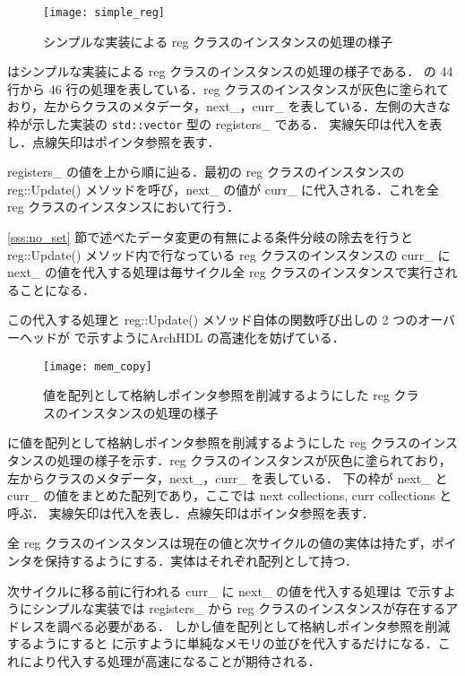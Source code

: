 \begin{figure}[t]
 \centering
 \texttt{[image: simple\_reg]}
 \caption{シンプルな実装による reg クラスのインスタンスの処理の様子}
 \label{fig:regs}
\end{figure}

 はシンプルな実装による reg クラスのインスタンスの処理の様子である．
の 44 行から 46 行の処理を表している．reg クラスのインスタンスが灰色に塗られており，左からクラスのメタデータ，next\_，curr\_
を表している．左側の大きな枠が示した実装の \verb`std::vector` 型の registers\_ である．
実線矢印は代入を表し．点線矢印はポインタ参照を表す．

registers\_ の値を上から順に辿る．最初の reg クラスのインスタンスの reg::Update() メソッドを呼び，next\_ の値が curr\_ に代入される．これを全 reg クラスのインスタンスにおいて行う．

\ref{sss:no_set} 節で述べたデータ変更の有無による条件分岐の除去を行うと
reg::Update() メソッド内で行なっている reg
クラスのインスタンスの curr\_ に next\_ の値を代入する処理は毎サイクル全
reg クラスのインスタンスで実行されることになる．

この代入する処理と reg::Update() メソッド自体の関数呼び出しの 2
つのオーバーヘッドが で示すようにArchHDL
の高速化を妨げている．

\begin{figure}[t]
 \centering
 \texttt{[image: mem\_copy]}
 \caption{値を配列として格納しポインタ参照を削減するようにした reg クラスのインスタンスの処理の様子}
 \label{fig:mem_copy}
\end{figure}

 に値を配列として格納しポインタ参照を削減するようにした reg クラスのインスタンスの処理の様子を示す．reg クラスのインスタンスが灰色に塗られており，左からクラスのメタデータ，next\_，curr\_ を表している．
下の枠が next\_ と curr\_ の値をまとめた配列であり，ここでは next collections, curr collections と呼ぶ．
実線矢印は代入を表し．点線矢印はポインタ参照を表す．

全 reg クラスのインスタンスは現在の値と次サイクルの値の実体は持たず，ポインタを保持するようにする．実体はそれぞれ配列として持つ．

次サイクルに移る前に行われる curr\_ に next\_ の値を代入する処理は  で示すようにシンプルな実装では registers\_ から reg クラスのインスタンスが存在するアドレスを調べる必要がある．
しかし値を配列として格納しポインタ参照を削減するようにすると  に示すように単純なメモリの並びを代入するだけになる．これにより代入する処理が高速になることが期待される．

